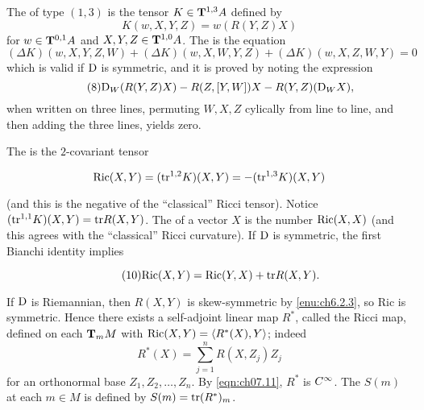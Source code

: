 \documentclass[../main]{subfiles}
\begin{document}
The  of type $(1, 3)$ is the tensor $K\in \tensorbundle{A}{1}{ 3}$ defined by 
\begin{equation}\tag{6}
\label{eqn:ch07.6} 
K(w, X, Y, Z) = w(R(Y, Z) X)
\end{equation}
for $w\in \tensorbundle{A}{0}{ 1}$ and $X, Y,Z\in\tensorbundle{A}{1}{ 0}$. The  is the equation 
\begin{equation}\tag{7}
\label{eqn:ch07.7}
(\Delta K)(w, X, Y, Z, W) + (\Delta K) (w, X, W, Y, Z) + (\Delta K)(w, X, Z, W, Y) = 0
\end{equation}
which is valid if $\connection$ is symmetric, and it is proved by noting the expression
\begin{equation}\tag{8}
\label{eqn:ch07.8}
\connection_W(R(Y, Z)X) - R(Z, [Y, W])X - R(Y, Z)(\connection_W X),
\end{equation}
when written on three lines, permuting $W, X, Z$ cylically from line to line, and then adding the three lines, yields zero.

The  is the $2$-covariant tensor 

\begin{equation}
\label{eqn:ch07.9}
\Ric(X, Y) = (\tr^{1, 2} K)(X, Y) = -(\tr^{1, 3}K)(X, Y)
\end{equation} 

(and this is the negative of the ``classical'' Ricci tensor). Notice \newline $(\tr^{1, 1} K)(X, Y) = \tr R(X, Y)$. The  of a vector $X$ is the number $\Ric(X, X)$ (and this agrees with the ``classical'' Ricci curvature). If $\connection$ is symmetric, the first Bianchi identity implies 

\begin{equation}\tag{10}
\label{eqn:ch07.10}
\Ric(X, Y) = \Ric(Y, X) + \tr R(X, Y).
\end{equation}

If $\connection$ is Riemannian, then $R(X, Y)$ is skew-symmetric by \ref{enu:ch6.2.3}, so Ric is symmetric. Hence there exists a self-adjoint linear map $R^\ast$, called the Ricci map, defined on each $\tangentspace M m$ with $\operatorname{Ric}(X, Y)= \ip {R^\ast(X)} Y$; indeed
\begin{equation}\tag{11}
\label{eqn:ch07.11}
R^\ast(X) = \sum_{j = 1}^n R(X, Z_j)Z_j
\end{equation}
for an orthonormal base $Z_1, Z_2, \ldots, Z_n$. By \eqref{eqn:ch07.11}, $R^\ast$ is $\CInfty$. The  $S(m)$ at each $m\in M$ is defined by $S(m) = \tr(R^\ast)_m$. 
\end{document}
